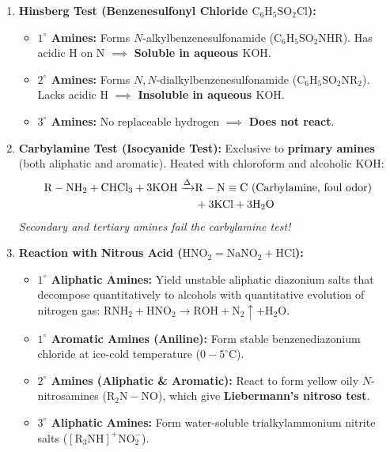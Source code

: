 \documentclass[10pt,twoside,openright]{book}
\begin{document}
\begin{usecasebox}
\begin{enumerate}[leftmargin=*]
  \item \textbf{Hinsberg Test (Benzenesulfonyl Chloride $\mathrm{C_6H_5SO_2Cl}$):}
  \begin{itemize}
    \item \textbf{$1^\circ$ Amines:} Forms $N$-alkylbenzenesulfonamide ($\mathrm{C_6H_5SO_2NHR}$). Has acidic H on N $\implies$ \textbf{Soluble in aqueous $\mathrm{KOH}$}.
    \item \textbf{$2^\circ$ Amines:} Forms $N,N$-dialkylbenzenesulfonamide ($\mathrm{C_6H_5SO_2NR_2}$). Lacks acidic H $\implies$ \textbf{Insoluble in aqueous $\mathrm{KOH}$}.
    \item \textbf{$3^\circ$ Amines:} No replaceable hydrogen $\implies$ \textbf{Does not react}.
  \end{itemize}
  \item \textbf{Carbylamine Test (Isocyanide Test):}
  Exclusive to \textbf{primary amines} (both aliphatic and aromatic). Heated with chloroform and alcoholic $\mathrm{KOH}$:
  \begin{align}
    \mathrm{R-NH_2} + \mathrm{CHCl_3} + 3\mathrm{KOH} \xrightarrow{\Delta} &\mathbf{\mathrm{R-N\equiv C}} \ (\text{Carbylamine, foul odor}) \notag \\
    &+ 3\mathrm{KCl} + 3\mathrm{H_2O}
  \end{align}
  \textit{Secondary and tertiary amines fail the carbylamine test!}
  \item \textbf{Reaction with Nitrous Acid ($\mathrm{HNO_2} = \mathrm{NaNO_2 + HCl}$):}
  \begin{itemize}
    \item \textbf{$1^\circ$ Aliphatic Amines:} Yield unstable aliphatic diazonium salts that decompose quantitatively to alcohols with quantitative evolution of nitrogen gas: $\mathrm{RNH_2} + \mathrm{HNO_2} \to \mathrm{ROH} + \mathbf{\mathrm{N_2}}\uparrow + \mathrm{H_2O}$.
    \item \textbf{$1^\circ$ Aromatic Amines (Aniline):} Form stable benzenediazonium chloride at ice-cold temperature ($0-5^\circ\text{C}$).
    \item \textbf{$2^\circ$ Amines (Aliphatic \& Aromatic):} React to form yellow oily $N$-nitrosamines ($\mathrm{R_2N-NO}$), which give \textbf{Liebermann's nitroso test}.
    \item \textbf{$3^\circ$ Aliphatic Amines:} Form water-soluble trialkylammonium nitrite salts ($\mathrm{[R_3NH]^+NO_2^-}$).
  \end{itemize}
\end{enumerate}
\end{usecasebox}
\end{document}
